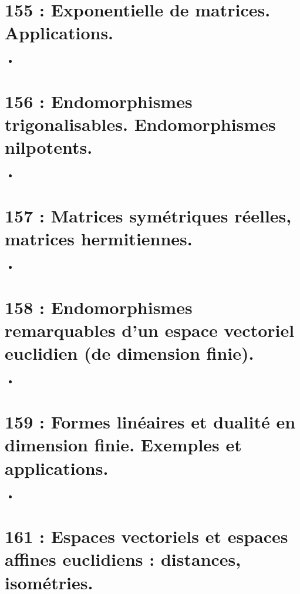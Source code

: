 \documentclass[a4paper,10pt,oneside,twocolumn,landscape]{book}
\begin{document}
\section{155 : Exponentielle de matrices. Applications.}

\begin{itemize}
	\item 
\end{itemize}




\section{156 : Endomorphismes trigonalisables. Endomorphismes nilpotents.}

\begin{itemize}
	\item 
\end{itemize}

\section{157 : Matrices symétriques réelles, matrices hermitiennes.}

\begin{itemize}
	\item 
\end{itemize}

\section{158 : Endomorphismes remarquables d’un espace vectoriel euclidien (de dimension
	finie).}

\begin{itemize}
	\item 
\end{itemize}


\section{159 : Formes linéaires et dualité en dimension finie. Exemples et applications.}

\begin{itemize}
	\item 
\end{itemize}


\section{161 : Espaces vectoriels et espaces affines euclidiens : distances, isométries.}
\end{document}
